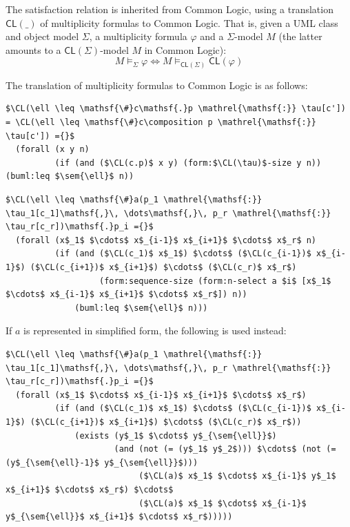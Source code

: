 \documentclass[10pt, a4paper]{isov2}
\newcommand*{\CL}{\ensuremath{\mathsf{CL}}\xspace}
\newcommand{\composition}{\raisebox{0.2pt}{\begin{sideways}\fontsize{6pt}{6pt}\selectfont$\blacklozenge$\end{sideways}}}
\newcommand{\sem}[1]{\mathopen\llbracket#1\mathclose\rrbracket}
\begin{document}

\label{a:UML-CD-sat}
The satisfaction relation is inherited from Common Logic, using
a translation $\CL(\_)$ of multiplicity formulas to Common Logic.
That is, given a UML class and object model $\Sigma$, a
multiplicity formula $\varphi$ and a $\Sigma$-model $M$ (the
latter amounts to a $\CL(\Sigma)$-model $M$ in Common Logic): 
%
\begin{equation*}
  M \models_\Sigma \varphi
\iff
  M \models_{\CL(\Sigma)} \CL(\varphi)
\end{equation*}

The translation of multiplicity formulas to Common Logic is as follows:

\begin{lstlisting}[language=clif, mathescape]
$\CL(\ell \leq \mathsf{\#}c\mathsf{.}p \mathrel{\mathsf{:}} \tau[c']) = \CL(\ell \leq \mathsf{\#}c\composition p \mathrel{\mathsf{:}} \tau[c']) ={}$
  (forall (x y n)
          (if (and ($\CL(c.p)$ x y) (form:$\CL(\tau)$-size y n)) (buml:leq $\sem{\ell}$ n))
\end{lstlisting}

\begin{lstlisting}[language=clif, mathescape]
$\CL(\ell \leq \mathsf{\#}a(p_1 \mathrel{\mathsf{:}} \tau_1[c_1]\mathsf{,}\, \dots\mathsf{,}\, p_r \mathrel{\mathsf{:}} \tau_r[c_r])\mathsf{.}p_i ={}$
  (forall (x$_1$ $\cdots$ x$_{i-1}$ x$_{i+1}$ $\cdots$ x$_r$ n)
          (if (and ($\CL(c_1)$ x$_1$) $\cdots$ ($\CL(c_{i-1})$ x$_{i-1}$) ($\CL(c_{i+1})$ x$_{i+1}$) $\cdots$ ($\CL(c_r)$ x$_r$)
                   (form:sequence-size (form:n-select a $i$ [x$_1$ $\cdots$ x$_{i-1}$ x$_{i+1}$ $\cdots$ x$_r$]) n))
              (buml:leq $\sem{\ell}$ n)))
\end{lstlisting}

\noindent If $a$ is represented in simplified form, the following is used instead:
\begin{lstlisting}[language=clif, mathescape]
$\CL(\ell \leq \mathsf{\#}a(p_1 \mathrel{\mathsf{:}} \tau_1[c_1]\mathsf{,}\, \dots\mathsf{,}\, p_r \mathrel{\mathsf{:}} \tau_r[c_r])\mathsf{.}p_i ={}$
  (forall (x$_1$ $\cdots$ x$_{i-1}$ x$_{i+1}$ $\cdots$ x$_r$)
          (if (and ($\CL(c_1)$ x$_1$) $\cdots$ ($\CL(c_{i-1})$ x$_{i-1}$) ($\CL(c_{i+1})$ x$_{i+1}$) $\cdots$ ($\CL(c_r)$ x$_r$))
              (exists (y$_1$ $\cdots$ y$_{\sem{\ell}}$)
                      (and (not (= (y$_1$ y$_2$))) $\cdots$ (not (= (y$_{\sem{\ell}-1}$ y$_{\sem{\ell}}$)))
                           ($\CL(a)$ x$_1$ $\cdots$ x$_{i-1}$ y$_1$ x$_{i+1}$ $\cdots$ x$_r$) $\cdots$
                           ($\CL(a)$ x$_1$ $\cdots$ x$_{i-1}$ y$_{\sem{\ell}}$ x$_{i+1}$ $\cdots$ x$_r$)))))
\end{lstlisting}
\end{document}
